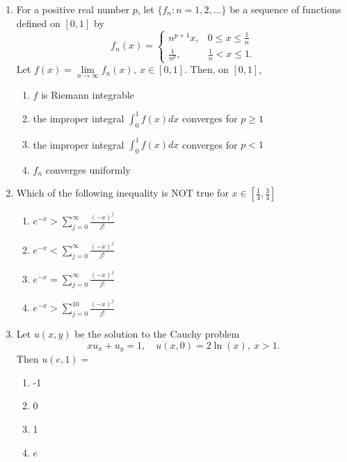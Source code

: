 \documentclass[journal]{IEEEtran}
\numberwithin{equation}{enumi}
\numberwithin{figure}{enumi}
\begin{document}
\begin{enumerate}
\item For a positive real number $p$, let $\{f_n: n=1,2,\dots\}$ be a sequence of functions defined on $[0,1]$ by
\[
f_n(x) =
\begin{cases}
n^{p+1} x, & 0 \leq x \leq \frac{1}{n} \\
\frac{1}{n^p}, & \frac{1}{n} < x \leq 1.
\end{cases}
\]
Let $f(x) = \lim\limits_{n \to \infty} f_n(x),\ x \in [0,1]$. Then, on $[0,1]$,
\hfill{}
\begin{enumerate}
    
\item $f$ is Riemann integrable \hspace{2cm}\\ 
\item the improper integral $\int_0^1 f(x) dx$ converges for $p \geq 1$ \\
\item the improper integral $\int_0^1 f(x) dx$ converges for $p < 1$ \hspace{2cm}\\
\item $f_n$ converges uniformly
\end{enumerate}


\item Which of the following inequality is NOT true for $x \in \left[ \frac{1}{4}, \frac{3}{4} \right]$
\hfill{}
\begin{multicols}{2}
\begin{enumerate}
\item  $e^{-x} > \sum_{j=0}^{\infty} \frac{(-x)^j}{j!}$ \hspace{2cm}
\item $e^{-x} < \sum_{j=0}^{\infty} \frac{(-x)^j}{j!}$ \\
\item $e^{-x} = \sum_{j=0}^{\infty} \frac{(-x)^j}{j!}$ \hspace{2cm}
\item $e^{-x} > \sum_{j=0}^{10} \frac{(-x)^j}{j!}$
\end{enumerate}
\end{multicols}

\item Let $u(x,y)$ be the solution to the Cauchy problem
\[
x u_x + u_y = 1, \quad u(x,0) = 2 \ln(x),\ x > 1.
\]
Then $u(e,1) =$
\hfill{}
\begin{multicols}{4}
\begin{enumerate}
    \item -1
    \item 0
    \item 1
    \item $e$
\end{enumerate}
\end{multicols}




\end{enumerate}
\end{document}
